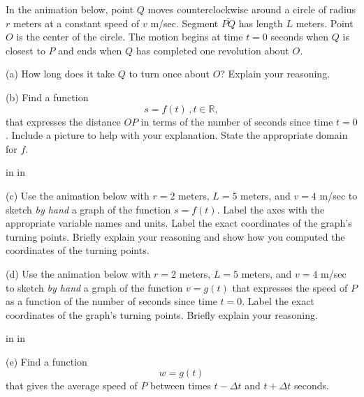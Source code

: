 \documentclass{ximera}
\newcommand{\pskip}{\vskip 0.1 in}
\begin{document}
\begin{question} \label{Q7:RightTriangle}
In the animation below, point $Q$ moves counterclockwise around a circle of radius $r$ meters at a constant speed of $v$ m/sec. Segment $\overline{PQ}$ has length $L$ meters. Point $O$ is the center of the circle. The motion begins at time $t=0$ seconds when $Q$ is closest to $P$ and ends when $Q$ has completed one revolution about $O$.

(a) How long does it take $Q$ to turn once about $O$? Explain your reasoning.

(b) Find a function 
\[
    s = f(t) \, , t \in \mathbb{R} ,
\] 
that expresses the distance $OP$ in terms of the number of seconds since time $t=0$. Include a picture to help with your explanation. State the appropriate domain for $f$.

\pskip \pskip

(c) Use the animation below with $r=2$ meters, $L=5$ meters, and $v=4$ m/sec to sketch \emph{by hand} a graph of the function $s=f(t)$. Label the axes with the appropriate variable names and units. Label the exact coordinates of the graph's turning points. Briefly explain your reasoning and show how you computed the coordinates of the turning points. 

(d) Use the animation below with $r=2$ meters, $L=5$ meters, and $v=4$ m/sec to sketch \emph{by hand} a graph of the function $v=g(t)$ that expresses the speed of $P$ as a function of the number of seconds since time $t=0$. Label the exact coordinates of the graph's turning points. Briefly explain your reasoning. 

\pskip \pskip

(e) Find a function
\[
    w = g(t)
\]
that gives the average speed of $P$ between times $t-\Delta t$ and $t+\Delta t$ seconds.

 
\begin{exploration}

 
\begin{onlineOnly}
    \begin{center}
\end{center}
\end{onlineOnly}
\end{exploration}

\end{question}
\end{document}
